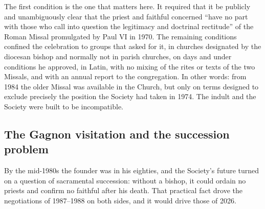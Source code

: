 The first condition is the one that matters here. It required that it be
publicly and unambiguously clear that the priest and faithful concerned
``have no part with those who call into question the legitimacy and
doctrinal rectitude'' of the Roman Missal promulgated by Paul VI in
1970. The remaining conditions confined the celebration to groups that
asked for it, in churches designated by the diocesan bishop and normally
not in parish churches, on days and under conditions he approved, in
Latin, with no mixing of the rites or texts of the two Missals, and with
an annual report to the congregation. In other words: from 1984 the older Missal was available in
the Church, but only on terms designed to exclude precisely the position
the Society had taken in 1974. The indult and the Society were built to
be incompatible.


\subsection{The Gagnon visitation and the succession problem}

By the mid-1980s the founder was in his eighties, and the Society's
future turned on a question of sacramental succession: without a bishop,
it could ordain no priests and confirm no faithful after his death. That
practical fact drove the negotiations of 1987--1988 on both sides, and it
would drive those of 2026.

